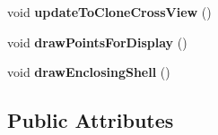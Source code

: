 \begin{DoxyCompactItemize}
\item 
\hypertarget{classGLWidget_aca5b0613fa48975e00b61abfcd5c87b5}{}void {\bfseries update\+To\+Clone\+Cross\+View} ()\label{classGLWidget_aca5b0613fa48975e00b61abfcd5c87b5}

\item 
\hypertarget{classGLWidget_af9b7537315485a04dd848ee62ac60b1e}{}void {\bfseries draw\+Points\+For\+Display} ()\label{classGLWidget_af9b7537315485a04dd848ee62ac60b1e}

\item 
\hypertarget{classGLWidget_ae613db32ea14ed70eeec575a9edf2398}{}void {\bfseries draw\+Enclosing\+Shell} ()\label{classGLWidget_ae613db32ea14ed70eeec575a9edf2398}

\end{DoxyCompactItemize}
\subsection*{Public Attributes}
